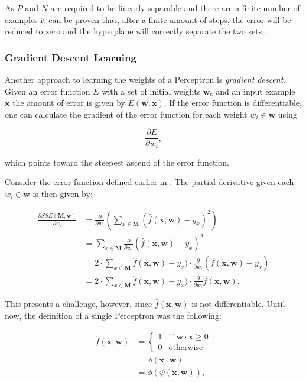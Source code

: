 As $P$ and $N$ are required to be linearly separable and there are a finite number of examples it can be proven that, after a finite amount of steps, the error will be reduced to zero and the hyperplane will correctly separate the two sets \cite{rojas_neural_1996}.

\subsubsection{Gradient Descent Learning}

Another approach to learning the weights of a Perceptron is \textit{gradient descent}.
Given an error function $E$ with a set of initial weights $\bm{w_t}$ and an input example $\bm{x}$ the amount of error is given by $E(\bm{w}, \bm{x})$.
If the error function is differentiable, one can calculate the gradient of the error function for each weight $w_i \in \bm{w}$ using

\begin{equation}
    \frac{\partial E}{\partial w_i},
\end{equation}

which points toward the steepest ascend of the error function.

Consider the error function defined earlier in .
The partial derivative given each $w_i \in \bm{w}$ is then given by:

\begin{equation}
    \label{eq:error-derivative-1}
    \begin{split}
        \frac{\partial SSE(\bm{M}, \bm{w})}{\partial w_i}
        &= \frac{\partial }{\partial w_i} \left( \sum_{x \in \bm{M}} (\hat{f}(\bm{x},\bm{w}) - y_x)^2 \right) \\
        &= \sum_{x \in \bm{M}} \frac{\partial }{\partial w_i} (\hat{f}(\bm{x},\bm{w}) - y_x)^2 \\
        &= 2 \cdot \sum_{x \in \bm{M}} \hat{f}(\bm{x},\bm{w}) - y_x) \cdot  \frac{\partial }{\partial w_i} (\hat{f}(\bm{x}, \bm{w}) - y_x) \\
        &= 2 \cdot \sum_{x \in \bm{M}} \hat{f}(\bm{x},\bm{w}) - y_x) \cdot  \frac{\partial }{\partial w_i} \hat{f}(\bm{x}, \bm{w}).
    \end{split}
\end{equation}

This presents a challenge, however, since $\hat{f}(\bm{x}, \bm{w})$ is not differentiable.
Until now, the definition of a single Perceptron was the following:

\begin{equation}
    \begin{split}
        \hat{f}(\bm{x}, \bm{w})
        &=
            \begin{cases}
                1 & \text{if } \bm{w} \cdot \bm{x} \geq 0 \\
                0 & \text{otherwise}
            \end{cases}
        \\
        &= \phi(\bm{x} \cdot \bm{w})
        \\
        &= \phi(\psi(\bm{x}, \bm{w})),
    \end{split}
\end{equation}

